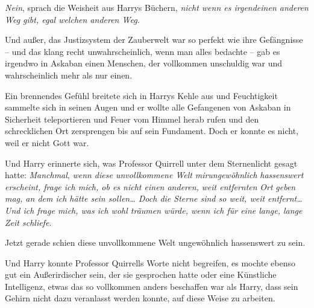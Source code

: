 \emph{Nein}, sprach die Weisheit aus Harrys Büchern, \emph{nicht wenn es irgendeinen anderen Weg gibt, egal welchen anderen Weg.}

Und außer, das Justizsystem der Zauberwelt war so perfekt wie ihre Gefängnisse -- und das klang recht unwahrscheinlich, wenn man alles bedachte -- gab es irgendwo in Askaban einen Menschen, der vollkommen unschuldig war und wahrscheinlich mehr als nur einen.

Ein brennendes Gefühl breitete sich in Harrys Kehle aus und Feuchtigkeit sammelte sich in seinen Augen und er wollte alle Gefangenen von Askaban in Sicherheit teleportieren und Feuer vom Himmel herab rufen und den schrecklichen Ort zersprengen bis auf sein Fundament. Doch er konnte es nicht, weil er nicht Gott war.

Und Harry erinnerte sich, was Professor Quirrell unter dem Sternenlicht gesagt hatte: \emph{Manchmal}, \emph{wenn diese unvollkommene Welt} \emph{mirungewöhnlich} \emph{hassenswert erscheint, frage ich mich, ob es nicht einen anderen,} \emph{weit entfernten} \emph{Ort} \emph{geben mag, an dem ich hätte sein sollen… Doch die Sterne sind so weit, weit entfernt… Und ich frage mich, was ich wohl träumen würde, wenn ich für eine lange, lange Zeit schliefe.}

Jetzt gerade schien diese unvollkommene Welt ungewöhnlich hassenswert zu sein.

Und Harry konnte Professor Quirrells Worte nicht begreifen, es mochte ebenso gut ein Außerirdischer sein, der sie gesprochen hatte oder eine Künstliche Intelligenz, etwas das so vollkommen anders beschaffen war als Harry, dass sein Gehirn nicht dazu veranlasst werden konnte, auf diese Weise zu arbeiten.


